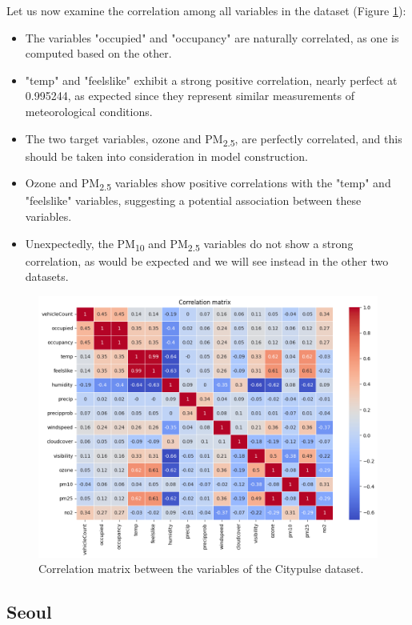 Let us now examine the correlation among all variables in the dataset (Figure \ref{fig:corr_matrix_citypulse}):
\begin{itemize}[noitemsep]

    \item The variables "occupied" and "occupancy" are naturally correlated, as one is computed based on the other.
    \item "temp" and "feelslike" exhibit a strong positive correlation, nearly perfect at 0.995244, as expected since they represent similar measurements of meteorological conditions.
    \item The two target variables, ozone and PM\textsubscript{2.5}, are perfectly correlated, and this should be taken into consideration in model construction.
    \item Ozone and PM\textsubscript{2.5} variables show positive correlations with the "temp" and "feelslike" variables, suggesting a potential association between these variables.
    \item Unexpectedly, the PM\textsubscript{10} and PM\textsubscript{2.5} variables do not show a strong correlation, as would be expected and we will see instead in the other two datasets.
\end{itemize}

\begin{figure}[h]
    \centering
    \includegraphics[width=0.75\linewidth]{images/corr_matrix_citypulse.png}
    \caption{Correlation matrix between the variables of the Citypulse dataset.}
    \label{fig:corr_matrix_citypulse}
\end{figure}

\newpage
\subsection{Seoul}

